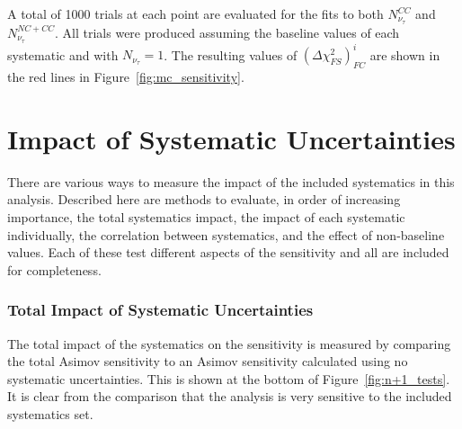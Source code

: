 A total of 1000 trials at each point are evaluated for the fits to both $N_{\nu_\tau}^{CC}$ and $N_{\nu_\tau}^{NC+CC}$.
All trials were produced assuming the baseline values of each systematic and with $N_{\nu_\tau}=1$.
The resulting values of $\left(\Delta \chi^2_{FS}\right)^i_{FC}$ are shown in the red lines in Figure~\ref{fig:mc_sensitivity}.





\label{sec:systematics_impact}
\section{Impact of Systematic Uncertainties}
There are various ways to measure the impact of the included systematics in this analysis.
Described here are methods to evaluate, in order of increasing importance, the total systematics impact, the impact of each systematic individually, the correlation between systematics, and the effect of non-baseline values.
Each of these test different aspects of the sensitivity and all are included for completeness.

\subsubsection{Total Impact of Systematic Uncertainties}
The total impact of the systematics on the sensitivity is measured by comparing the total Asimov sensitivity to an Asimov sensitivity calculated using no systematic uncertainties.
This is shown at the bottom of Figure~\ref{fig:n+1_tests}.
It is clear from the comparison that the analysis is very sensitive to the included systematics set.


